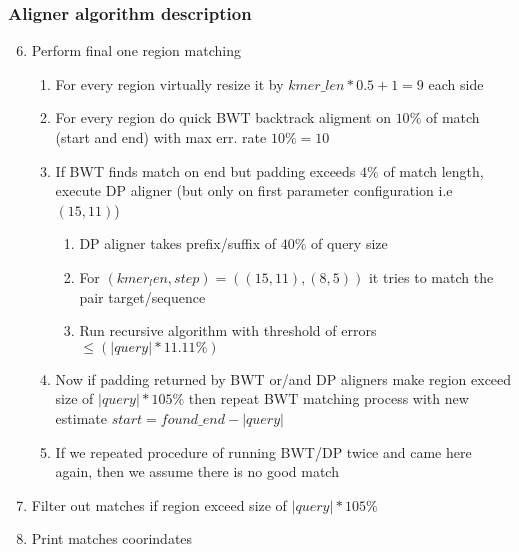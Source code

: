 \documentclass{beamer}
\begin{document}
\begin{frame}
  \frametitle{Aligner algorithm description}
  \scriptsize
  \begin{enumerate}
    \setcounter{enumi}{5}
    \item Perform final one region matching
    \begin{enumerate}
      \scriptsize
      \item For every region virtually resize it by $kmer\_len*0.5+1 = 9$ each side
      \item For every region do quick BWT backtrack aligment on $10\%$ of match (start and end) with max err. rate $10\%=10$
      \item If BWT finds match on end but padding exceeds $4\%$ of match length, execute DP aligner (but only on first parameter configuration i.e $(15, 11)$)
      \begin{enumerate}
        \scriptsize
        \item DP aligner takes prefix/suffix of $40\%$ of query size
        \item For $(kmer_len, step) = ((15, 11), (8, 5))$ it tries to match the pair target/sequence
        \item Run recursive algorithm with threshold of errors $\leq (|query| * 11.11\%)$
      \end{enumerate}
      \item Now if padding returned by BWT or/and DP aligners make region exceed size of $|query|*105\%$ then repeat BWT matching process with new estimate $start = found\_end - |query|$
      \item If we repeated procedure of running BWT/DP twice and came here again, then we assume there is no good match
    \end{enumerate}
    \item Filter out matches if region exceed size of $|query|*105\%$
    \item Print matches coorindates
  \end{enumerate}

\end{frame}
\end{document}
